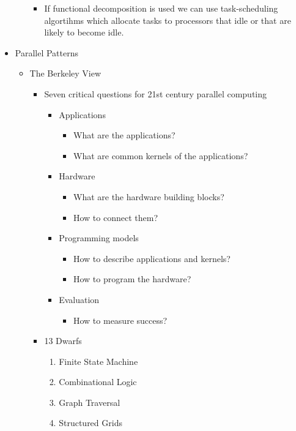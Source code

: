 \documentclass[paper=a4, fontsize=11pt]{scrartcl} %
\numberwithin{equation}{section} %
\numberwithin{figure}{section} %
\numberwithin{table}{section} %
\begin{document}
\begin{itemize}
\begin{itemize}
\begin{itemize}
      \item If functional decomposition is used we can use task-scheduling algortihms which allocate tasks to processors that idle or that are likely to become idle.
    \end{itemize}
  \end{itemize}
  \item Parallel Patterns
  \begin{itemize}
    \item The Berkeley View
    \begin{itemize}
      \item Seven critical questions for 21st century parallel computing
      \begin{itemize}
        \item Applications
        \begin{itemize}
          \item What are the applications?
          \item What are common kernels of the applications?
        \end{itemize}
        \item Hardware
        \begin{itemize}
          \item What are the hardware building blocks?
          \item How to connect them?
        \end{itemize}
        \item Programming models
        \begin{itemize}
          \item How to describe applications and kernels?
          \item How to program the hardware?
        \end{itemize}
        \item Evaluation
        \begin{itemize}
          \item How to measure success?
        \end{itemize}
      \end{itemize}
      \item 13 Dwarfs
      \begin{enumerate}
        \item Finite State Machine
        \item Combinational Logic
        \item Graph Traversal
        \item Structured Grids

\end{enumerate}
\end{itemize}
\end{itemize}
\end{itemize}
\end{document}
